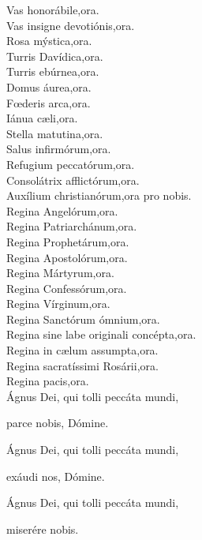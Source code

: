 Vas honorábile,\hfill ora.\\
Vas insigne devotiónis,\hfill ora.\\
Rosa mýstica,\hfill ora.\\
Turris Davídica,\hfill ora.\\
Turris ebúrnea,\hfill ora.\\
Domus áurea,\hfill ora.\\
F{\oe}deris arca,\hfill ora.\\
Iánua c{\ae}li,\hfill ora.\\
Stella matutina,\hfill ora.\\
Salus infirmórum,\hfill ora.\\
Refugium peccatórum,\hfill ora.\\
Consolátrix afflictórum,\hfill ora.\\
Auxílium christianórum,\hfill ora pro nobis.\\
Regina Angelórum,\hfill ora.\\
Regina Patriarchánum,\hfill ora.\\
Regina Prophetárum,\hfill ora.\\
Regina Apostolórum,\hfill ora.\\
Regina Mártyrum,\hfill ora.\\
Regina Confessórum,\hfill ora.\\
Regina Vírginum,\hfill ora.\\
Regina Sanctórum ómnium,\hfill ora.\\
Regina sine labe originali concépta,\hfill ora.\\
Regina in c{\ae}lum assumpta,\hfill ora.\\
Regina sacratíssimi Rosárii,\hfill ora.\\
Regina pacis,\hfill ora.\\
Ágnus Dei, qui tolli peccáta mundi,

\hfill parce nobis, Dómine.

Ágnus Dei, qui tolli peccáta mundi, 

\hfill exáudi nos, Dómine.

Ágnus Dei, qui tolli peccáta mundi, 

\hfill miserére nobis.
